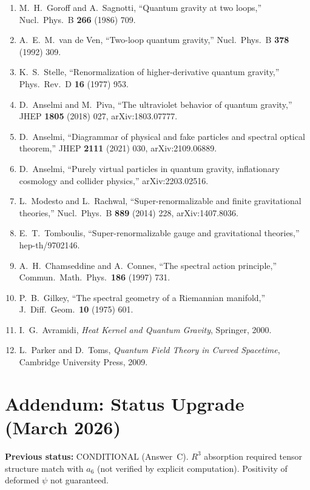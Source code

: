 \documentclass[12pt,a4paper]{article}
\begin{document}
\begin{enumerate}
  \item M.~H.~Goroff and A.~Sagnotti, ``Quantum gravity at two loops,''
    Nucl.\ Phys.\ B \textbf{266} (1986) 709.
  \item A.~E.~M.~van de Ven, ``Two-loop quantum gravity,''
    Nucl.\ Phys.\ B \textbf{378} (1992) 309.
  \item K.~S.~Stelle, ``Renormalization of higher-derivative quantum gravity,''
    Phys.\ Rev.\ D \textbf{16} (1977) 953.
  \item D.~Anselmi and M.~Piva, ``The ultraviolet behavior of quantum gravity,''
    JHEP \textbf{1805} (2018) 027, arXiv:1803.07777.
  \item D.~Anselmi, ``Diagrammar of physical and fake particles and spectral
    optical theorem,'' JHEP \textbf{2111} (2021) 030, arXiv:2109.06889.
  \item D.~Anselmi, ``Purely virtual particles in quantum gravity, inflationary
    cosmology and collider physics,'' arXiv:2203.02516.
  \item L.~Modesto and L.~Rachwal, ``Super-renormalizable and finite
    gravitational theories,'' Nucl.\ Phys.\ B \textbf{889} (2014) 228,
    arXiv:1407.8036.
  \item E.~T.~Tomboulis, ``Super-renormalizable gauge and gravitational theories,''
    hep-th/9702146.
  \item A.~H.~Chamseddine and A.~Connes, ``The spectral action principle,''
    Commun.\ Math.\ Phys.\ \textbf{186} (1997) 731.
  \item P.~B.~Gilkey, ``The spectral geometry of a Riemannian manifold,''
    J.\ Diff.\ Geom.\ \textbf{10} (1975) 601.
  \item I.~G.~Avramidi, \emph{Heat Kernel and Quantum Gravity},
    Springer, 2000.
  \item L.~Parker and D.~Toms, \emph{Quantum Field Theory in Curved Spacetime},
    Cambridge University Press, 2009.
\end{enumerate}

\section*{Addendum: Status Upgrade (March 2026)}
\label{sec:addendum}

\noindent\textbf{Previous status:} CONDITIONAL (Answer~C).
$R^3$ absorption required tensor structure match with $a_6$ (not verified
by explicit computation).  Positivity of deformed $\psi$ not guaranteed.
\end{document}
